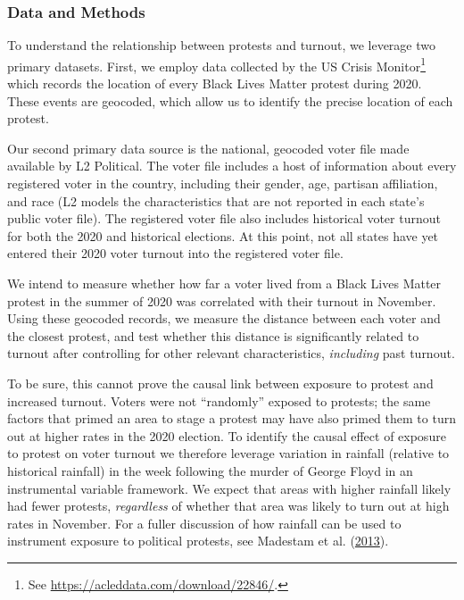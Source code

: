 \documentclass[
  12pt,
]{article}
\begin{document}
\hypertarget{data-and-methods}{%
\subsubsection*{Data and Methods}\label{data-and-methods}}

To understand the relationship between protests and turnout, we leverage two primary datasets. First, we employ data collected by the US Crisis Monitor\footnote{See \url{https://acleddata.com/download/22846/}.} which records the location of every Black Lives Matter protest during 2020. These events are geocoded, which allow us to identify the precise location of each protest.

Our second primary data source is the national, geocoded voter file made available by L2 Political. The voter file includes a host of information about every registered voter in the country, including their gender, age, partisan affiliation, and race (L2 models the characteristics that are not reported in each state's public voter file). The registered voter file also includes historical voter turnout for both the 2020 and historical elections. At this point, not all states have yet entered their 2020 voter turnout into the registered voter file.

We intend to measure whether how far a voter lived from a Black Lives Matter protest in the summer of 2020 was correlated with their turnout in November. Using these geocoded records, we measure the distance between each voter and the closest protest, and test whether this distance is significantly related to turnout after controlling for other relevant characteristics, \emph{including} past turnout.

To be sure, this cannot prove the causal link between exposure to protest and increased turnout. Voters were not ``randomly'' exposed to protests; the same factors that primed an area to stage a protest may have also primed them to turn out at higher rates in the 2020 election. To identify the causal effect of exposure to protest on voter turnout we therefore leverage variation in rainfall (relative to historical rainfall) in the week following the murder of George Floyd in an instrumental variable framework. We expect that areas with higher rainfall likely had fewer protests, \emph{regardless} of whether that area was likely to turn out at high rates in November. For a fuller discussion of how rainfall can be used to instrument exposure to political protests, see Madestam et al. (\protect\hyperlink{ref-Madestam2013}{2013}).
\end{document}
